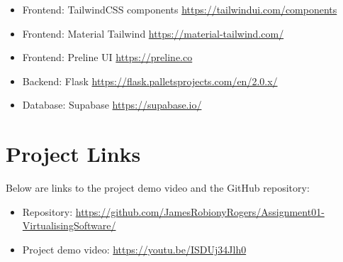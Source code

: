 \documentclass[a4paper, 11pt]{article}
\begin{document}
\begin{itemize}
    \item Frontend: TailwindCSS components \url{https://tailwindui.com/components}
    \item Frontend: Material Tailwind \url{https://material-tailwind.com/}
    \item Frontend: Preline UI \url{https://preline.co}
    \item Backend: Flask \url{https://flask.palletsprojects.com/en/2.0.x/}
    \item Database: Supabase \url{https://supabase.io/}
\end{itemize}

\section{Project Links}
Below are links to the project demo video and the GitHub repository:

\begin{itemize}
    \item Repository: \url{https://github.com/JamesRobionyRogers/Assignment01-VirtualisingSoftware/}
    \item Project demo video: \url{https://youtu.be/ISDUj34Jlh0}
\end{itemize}
\end{document}
